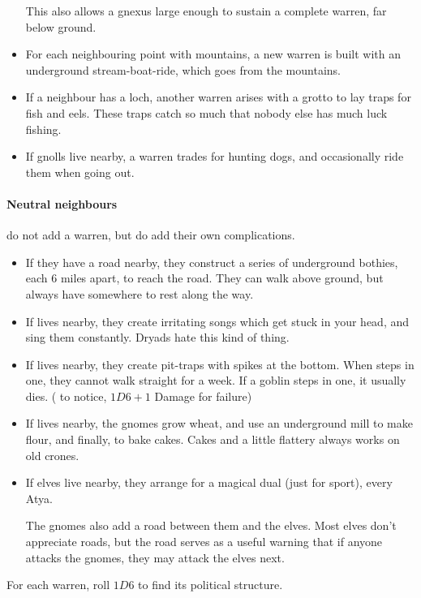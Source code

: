 \begin{multicols}{2}
\begin{itemize}
  This also allows a gnexus large enough to sustain a complete warren, far below ground.
  \item
  For each neighbouring point with mountains, a new warren is built with an underground stream-boat-ride, which goes from the mountains.
  \item
  If a neighbour has a loch, another warren arises with a grotto to lay traps for fish and eels.
  These traps catch so much that nobody else has much luck fishing.
  \item
  If gnolls live nearby, a warren trades for hunting dogs, and occasionally ride them when going out.
\end{itemize}

\paragraph{Neutral neighbours}
do not add a warren, but do add their own complications.

\begin{itemize}
  \item
  If they have a road nearby, they construct a series of underground bothies, each 6 miles apart, to reach the road.
  They can walk above ground, but always have somewhere to rest along the way.
  \item
  If  lives nearby, they create irritating songs which get stuck in your head, and sing them constantly.  Dryads hate this kind of thing.
  \item
  If  lives nearby, they create pit-traps with spikes at the bottom.
  When  steps in one, they cannot walk straight for a week.
  If a goblin steps in one, it usually dies.
  ( \tn[12] to notice, $1D6+1$ Damage for failure)
  \item
  If  lives nearby, the gnomes grow wheat, and use an underground mill to make flour, and finally, to bake cakes.  Cakes and a little flattery always works on old crones.
  \item
  If elves live nearby, they arrange for a magical dual (just for sport), every \gls{Atya}.

  The gnomes also add a road between them and the elves.
  Most elves don't appreciate roads, but the road serves as a useful warning that if anyone attacks the gnomes, they may attack the elves next.
\end{itemize}

For each warren, roll $1D6$ to find its political structure.


\end{multicols}
